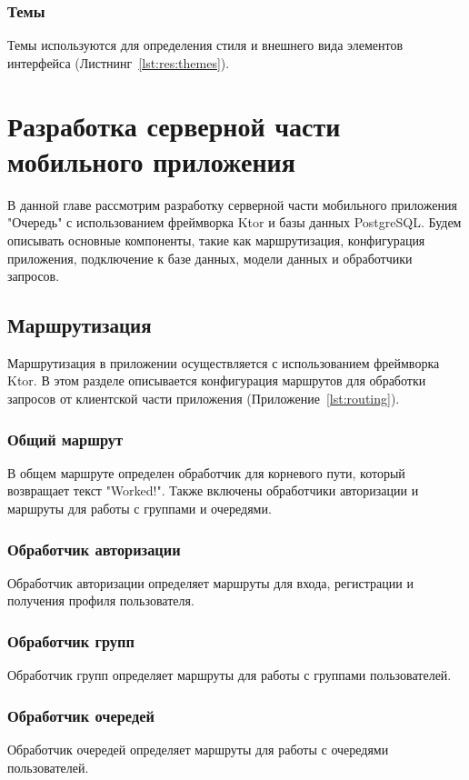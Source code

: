 \subsubsection{Темы}
Темы используются для определения стиля и внешнего вида элементов интерфейса
(Листнинг~\ref{lst:res:themes}).


\section{Разработка серверной части мобильного приложения}

В данной главе рассмотрим разработку серверной части мобильного приложения
"Очередь" с использованием фреймворка Ktor и базы данных PostgreSQL.
Будем описывать основные компоненты, такие как маршрутизация,
конфигурация приложения, подключение к базе данных,
модели данных и обработчики запросов.

\subsection{Маршрутизация}

Маршрутизация в приложении осуществляется с использованием фреймворка Ktor.
В этом разделе описывается конфигурация маршрутов
для обработки запросов от клиентской части приложения
(Приложение~\ref{lst:routing}).

\subsubsection{Общий маршрут}
В общем маршруте определен обработчик для корневого пути,
который возвращает текст "Worked!".
Также включены обработчики авторизации
и маршруты для работы с группами и очередями.

\subsubsection{Обработчик авторизации}
Обработчик авторизации определяет маршруты для входа,
регистрации и получения профиля пользователя.

\subsubsection{Обработчик групп}
Обработчик групп определяет маршруты для работы с группами пользователей.

\subsubsection{Обработчик очередей}
Обработчик очередей определяет маршруты для работы с очередями пользователей.

